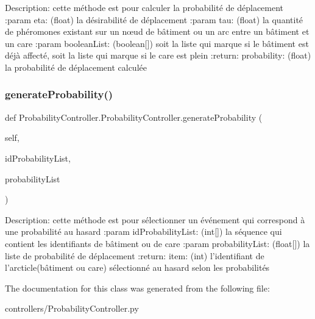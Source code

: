\begin{DoxyVerb}Description: cette méthode est pour calculer la probabilité de déplacement
:param eta: (float) la désirabilité de déplacement
:param tau: (float) la quantité de phéromones existant sur un nœud de bâtiment ou un arc entre un bâtiment et un care
:param booleanList: (boolean[]) soit la liste qui marque si le bâtiment est déjà affecté, soit la liste qui marque si le care est plein
:return: probability: (float) la probabilité de déplacement calculée
\end{DoxyVerb}
 \mbox{\label{class_probability_controller_1_1_probability_controller_a0cb0e1ffa81219cf1493859c897edb01}} 
\subsubsection{\texorpdfstring{generate\+Probability()}{generateProbability()}}
{\footnotesize\ttfamily def Probability\+Controller.\+Probability\+Controller.\+generate\+Probability (\begin{DoxyParamCaption}\item[{}]{self,  }\item[{}]{id\+Probability\+List,  }\item[{}]{probability\+List }\end{DoxyParamCaption})}

\begin{DoxyVerb}Description: cette méthode est pour sélectionner un événement qui correspond à une probabilité au hasard
:param idProbabilityList: (int[]) la séquence qui contient les identifiants de bâtiment ou de care
:param probabilityList: (float[]) la liste de probabilité de déplacement
:return: item: (int) l'identifiant de l'arcticle(bâtiment ou care) sélectionné au hasard selon les probabilités
\end{DoxyVerb}
 

The documentation for this class was generated from the following file\+:\begin{DoxyCompactItemize}
\item 
controllers/Probability\+Controller.\+py\end{DoxyCompactItemize}
